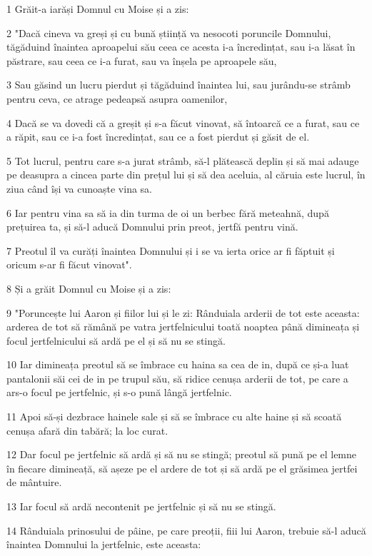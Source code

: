 \par 1 Grăit-a iarăși Domnul cu Moise și a zis:
\par 2 "Dacă cineva va greși și cu bună știință va nesocoti poruncile Domnului, tăgăduind înaintea aproapelui său ceea ce acesta i-a încredințat, sau i-a lăsat în păstrare, sau ceea ce i-a furat, sau va înșela pe aproapele său,
\par 3 Sau găsind un lucru pierdut și tăgăduind înaintea lui, sau jurându-se strâmb pentru ceva, ce atrage pedeapsă asupra oamenilor,
\par 4 Dacă se va dovedi că a greșit și s-a făcut vinovat, să întoarcă ce a furat, sau ce a răpit, sau ce i-a fost încredințat, sau ce a fost pierdut și găsit de el.
\par 5 Tot lucrul, pentru care s-a jurat strâmb, să-l plătească deplin și să mai adauge pe deasupra a cincea parte din prețul lui și să dea aceluia, al căruia este lucrul, în ziua când își va cunoaște vina sa.
\par 6 Iar pentru vina sa să ia din turma de oi un berbec fără meteahnă, după prețuirea ta, și să-l aducă Domnului prin preot, jertfă pentru vină.
\par 7 Preotul îl va curăți înaintea Domnului și i se va ierta orice ar fi făptuit și oricum s-ar fi făcut vinovat".
\par 8 Și a grăit Domnul cu Moise și a zis:
\par 9 "Poruncește lui Aaron și fiilor lui și le zi: Rânduiala arderii de tot este aceasta: arderea de tot să rămână pe vatra jertfelnicului toată noaptea până dimineața și focul jertfelnicului să ardă pe el și să nu se stingă.
\par 10 Iar dimineața preotul să se îmbrace cu haina sa cea de in, după ce și-a luat pantalonii săi cei de in pe trupul său, să ridice cenușa arderii de tot, pe care a ars-o focul pe jertfelnic, și s-o pună lângă jertfelnic.
\par 11 Apoi să-și dezbrace hainele sale și să se îmbrace cu alte haine și să scoată cenușa afară din tabără; la loc curat.
\par 12 Dar focul pe jertfelnic să ardă și să nu se stingă; preotul să pună pe el lemne în fiecare dimineață, să așeze pe el ardere de tot și să ardă pe el grăsimea jertfei de mântuire.
\par 13 Iar focul să ardă necontenit pe jertfelnic și să nu se stingă.
\par 14 Rânduiala prinosului de pâine, pe care preoții, fiii lui Aaron, trebuie să-l aducă înaintea Domnului la jertfelnic, este aceasta:
